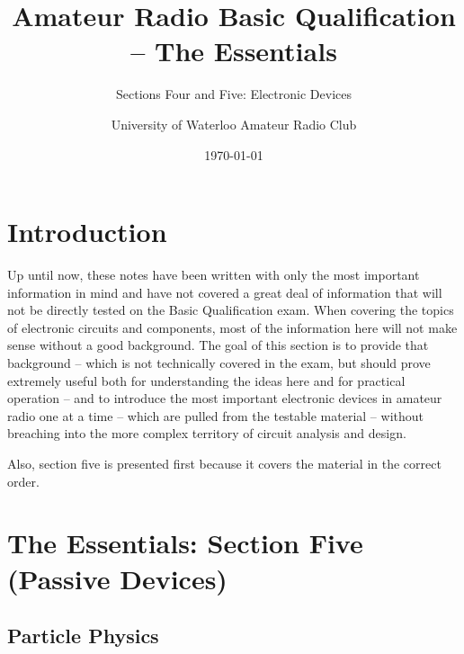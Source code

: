 \documentclass[letterpaper,12pt]{scrartcl}
\title{Amateur Radio Basic Qualification -- The Essentials}
\subtitle{Sections Four and Five: Electronic Devices}
\author{University of Waterloo Amateur Radio Club}
\date{\today}
\begin{document}
\maketitle
\tableofcontents

\section{Introduction}


Up until now, these notes have been written with only the most important information in mind and have not covered
a great deal of information that will not be directly tested on the Basic Qualification exam.
When covering the topics of electronic circuits and components, most of the information here will not make sense
without a good background. The goal of this section is to provide that background -- which is not technically covered in the exam,
but should prove extremely useful both for understanding the ideas here and for practical operation --
and to introduce the most important electronic devices in amateur radio one at a time
-- which are pulled from the testable material -- without breaching into the more complex territory of circuit analysis and design.

Also, section five is presented first because it covers the material in the correct order.

\section{The Essentials: Section Five (Passive Devices)}

\subsection{Particle Physics}
\end{document}
